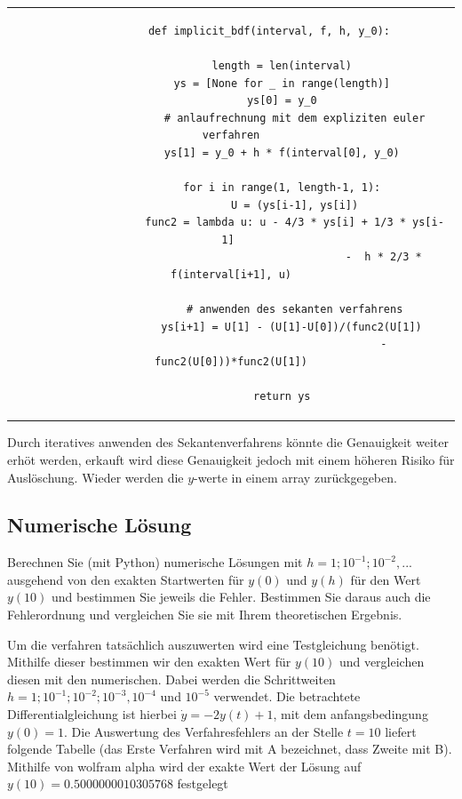 \documentclass{article}
\begin{document}
 			\begin{tabular}{c}
 			\begin{lstlisting}
			def implicit_bdf(interval, f, h, y_0):

   				length = len(interval)
    			ys = [None for _ in range(length)]
    			ys[0] = y_0
					# anlaufrechnung mit dem expliziten euler verfahren
    			ys[1] = y_0 + h * f(interval[0], y_0)

    			for i in range(1, length-1, 1):
        			U = (ys[i-1], ys[i])
        			func2 = lambda u: u - 4/3 * ys[i] + 1/3 * ys[i-1] 
        										-  h * 2/3 * f(interval[i+1], u)
        										
        			# anwenden des sekanten verfahrens
       				ys[i+1] = U[1] - (U[1]-U[0])/(func2(U[1]) 
       											- func2(U[0]))*func2(U[1])
       				
		    	return ys
 			\end{lstlisting}
 			\end{tabular}	
 			\newline
 			
 			Durch iteratives anwenden des Sekantenverfahrens könnte die Genauigkeit weiter erhöt werden, erkauft wird diese Genauigkeit jedoch mit einem höheren Risiko für Auslöschung.
 			Wieder werden die $y$-werte in einem array zurückgegeben.
	
		
	\subsection{Numerische Lösung}
	
		Berechnen Sie (mit Python) numerische Lösungen mit $h = 1; 10^{-1} ; 10^{-2} , ...$ ausgehend von den exakten Startwerten für $y(0)$ und $y(h)$ für den Wert $y(10)$ und bestimmen Sie jeweils die Fehler. Bestimmen Sie daraus auch die Fehlerordnung und vergleichen Sie sie mit Ihrem theoretischen Ergebnis.
		
		Um die verfahren tatsächlich auszuwerten wird eine Testgleichung benötigt.
		Mithilfe dieser bestimmen wir den exakten Wert für $y(10)$ und vergleichen diesen mit den numerischen. Dabei werden die Schrittweiten
		$h = 1; 10^{-1} ; 10^{-2}; 10^{-3}, 10^{-4}$ und $10^{-5}$ verwendet. Die betrachtete Differentialgleichung ist hierbei $\dot{y} = -2y(t) + 1$, mit dem anfangsbedingung $y(0) = 1$.
		Die Auswertung des Verfahresfehlers an der Stelle $t = 10$ liefert folgende Tabelle (das Erste Verfahren wird mit A bezeichnet, dass Zweite mit B). Mithilfe von wolfram alpha
		wird der exakte Wert der Lösung auf $y(10) = 0.5000000010305768$ festgelegt
		\newline
		
\end{document}
